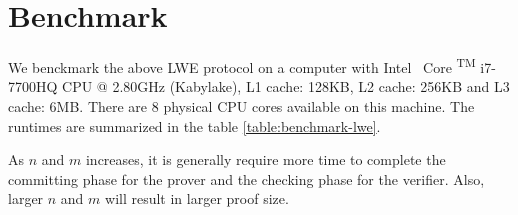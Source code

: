 \section{Benchmark}

We benckmark the above LWE protocol on a computer with
Intel \textregistered \, Core  \textsuperscript{TM} i7-7700HQ CPU @ 2.80GHz (Kabylake), L1 cache: 128KB, L2 cache: 256KB and L3 cache: 6MB. There are 8 physical CPU cores available on this machine. The runtimes are summarized in the table \ref{table:benchmark-lwe}.


As $n$ and $m$ increases, it is generally require more time to complete
the committing phase for the prover and the checking phase for the verifier. Also, larger $n$ and $m$ will result in larger proof size.




